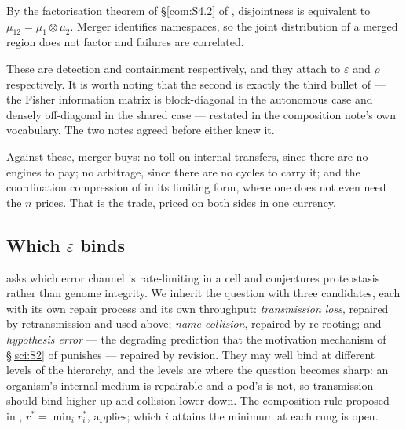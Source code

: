 \begin{proposition}\label{eng:merger-destroys-independence}
By the factorisation theorem of \S\ref{com:S4.2} of \chComp, disjointness is
equivalent to $\mu_{12} = \mu_1 \otimes \mu_2$. Merger identifies
namespaces, so the joint distribution of a merged region does not factor
and failures are correlated.
\end{proposition}

These are detection and containment respectively, and they attach to
$\varepsilon$ and $\rho$ respectively. It is worth noting that the second
is exactly the third bullet of \cite[\S1]{compaut} --- the Fisher
information matrix is block-diagonal in the autonomous case and densely
off-diagonal in the shared case --- restated in the composition note's own
vocabulary. The two notes agreed before either knew it.

Against these, merger buys: no toll on internal transfers, since there are
no engines to pay; no arbitrage, since there are no cycles to carry it; and
the coordination compression of \cite[\S5]{vtok} in its limiting form,
where one does not even need the $n$ prices. That is the trade, priced on
both sides in one currency.

\subsection{Which $\varepsilon$ binds}\label{eng:S8.6}
\label{eng:sec:whicheps}

\cite{compaut} asks which error channel is rate-limiting in a cell and
conjectures proteostasis rather than genome integrity. We inherit the
question with three candidates, each with its own repair process and its
own throughput: \emph{transmission loss}, repaired by retransmission and
used above; \emph{name collision}, repaired by re-rooting; and
\emph{hypothesis error} --- the degrading prediction that the motivation
mechanism of \S\ref{sci:S2} of \chSci punishes --- repaired by revision. They
may well bind at different levels of the hierarchy, and the levels are
where the question becomes sharp: an organism's internal medium is
repairable and a pod's is not, so transmission should bind higher up and
collision lower down. The composition rule proposed in \cite{compaut},
$r^\ast = \min_i r^\ast_i$, applies; which $i$ attains the minimum at each
rung is open.

